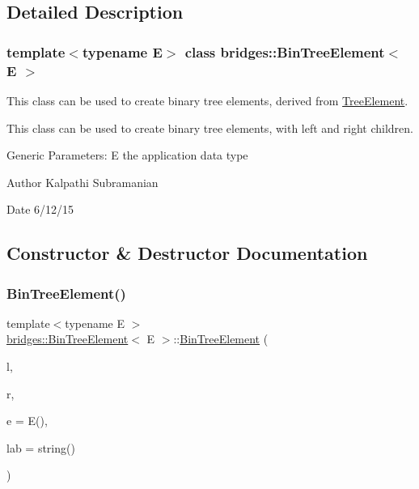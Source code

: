 \subsection{Detailed Description}
\subsubsection*{template$<$typename E$>$\newline
class bridges\+::\+Bin\+Tree\+Element$<$ E $>$}

This class can be used to create binary tree elements, derived from \hyperlink{classbridges_1_1_tree_element}{Tree\+Element}. 

This class can be used to create binary tree elements, with left and right children.

Generic Parameters\+: E the application data type

\begin{DoxyAuthor}{Author}
Kalpathi Subramanian 
\end{DoxyAuthor}
\begin{DoxyDate}{Date}
6/12/15 
\end{DoxyDate}


\subsection{Constructor \& Destructor Documentation}
\hypertarget{classbridges_1_1_bin_tree_element_a1c60db90bda9ecd3f5a61b5f33f49173}{}\label{classbridges_1_1_bin_tree_element_a1c60db90bda9ecd3f5a61b5f33f49173} 
\subsubsection{\texorpdfstring{Bin\+Tree\+Element()}{BinTreeElement()}\hspace{0.1cm}{\footnotesize\ttfamily [1/2]}}
{\footnotesize\ttfamily template$<$typename E $>$ \\
\hyperlink{classbridges_1_1_bin_tree_element}{bridges\+::\+Bin\+Tree\+Element}$<$ E $>$\+::\hyperlink{classbridges_1_1_bin_tree_element}{Bin\+Tree\+Element} (\begin{DoxyParamCaption}\item[{\hyperlink{classbridges_1_1_bin_tree_element}{Bin\+Tree\+Element}$<$ E $>$ $\ast$}]{l,  }\item[{\hyperlink{classbridges_1_1_bin_tree_element}{Bin\+Tree\+Element}$<$ E $>$ $\ast$}]{r,  }\item[{const E \&}]{e = {\ttfamily E()},  }\item[{const string \&}]{lab = {\ttfamily string()} }\end{DoxyParamCaption})\hspace{0.3cm}{\ttfamily [inline]}}

